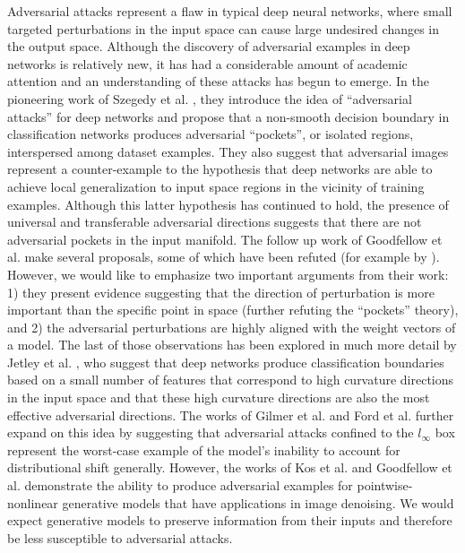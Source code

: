 Adversarial attacks represent a flaw in typical deep neural networks, where small targeted perturbations in the input space can cause large undesired changes in the output space.
Although the discovery of adversarial examples in deep networks is relatively new, it has had a considerable amount of academic attention and an understanding of these attacks has begun to emerge.
In the pioneering work of Szegedy et al. \citeyearpar{szegedy2013intriguing}, they introduce the idea of ``adversarial attacks'' for deep networks and propose that a non-smooth decision boundary in classification networks produces adversarial ``pockets'', or isolated regions, interspersed among dataset examples.
They also suggest that adversarial images represent a counter-example to the hypothesis that deep networks are able to achieve local generalization to input space regions in the vicinity of training examples.
Although this latter hypothesis has continued to hold, the presence of universal and transferable adversarial directions \parencite{moosavi2017universal} suggests that there are not adversarial pockets in the input manifold.
The follow up work of Goodfellow et al. \citeyearpar{goodfellow2014explaining} make several proposals, some of which have been refuted (for example by \cite{jetley2018friends}).
However, we would like to emphasize two important arguments from their work: 1) they present evidence suggesting that the direction of perturbation is more important than the specific point in space (further refuting the ``pockets'' theory), and 2) the adversarial perturbations are highly aligned with the weight vectors of a model.
The last of those observations has been explored in much more detail by Jetley et al. \citeyearpar{jetley2018friends}, who suggest that deep networks produce classification boundaries based on a small number of features that correspond to high curvature directions in the input space and that these high curvature directions are also the most effective adversarial directions.
The works of Gilmer et al. \citeyearpar{gilmer2018adversarial} and Ford et al. \citeyearpar{ford2019adversarial} further expand on this idea by suggesting that adversarial attacks confined to the $l_{\infty}$ box represent the worst-case example of the model's inability to account for distributional shift generally.
However, the works of Kos et al. \citeyearpar{kos2018adversarial} and Goodfellow et al. \citeyearpar{goodfellow2014explaining} demonstrate the ability to produce adversarial examples for pointwise-nonlinear generative models that have applications in image denoising.
We would expect generative models to preserve information from their inputs and therefore be less susceptible to adversarial attacks.
